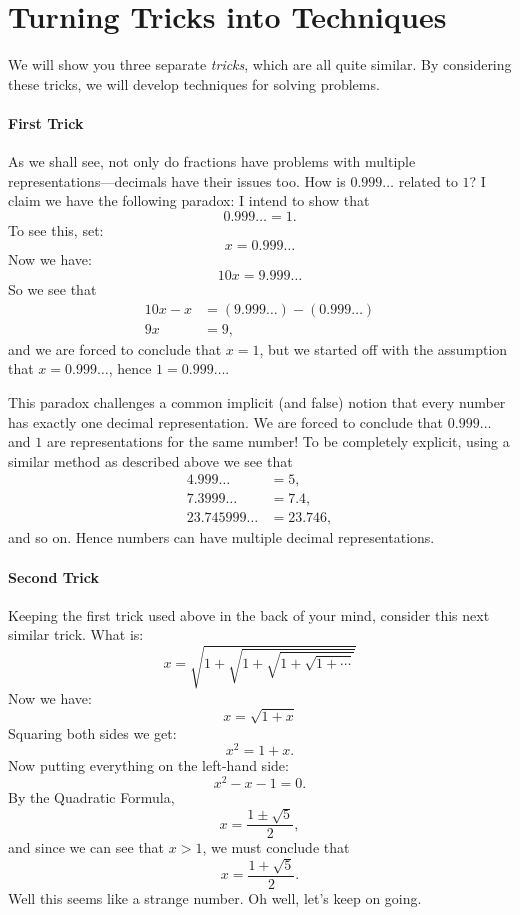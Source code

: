 \newpage
\section{Turning Tricks into Techniques}

We will show you three separate \textit{tricks}, which are all quite
similar. By considering these tricks, we will develop techniques for
solving problems.

\paragraph{First Trick} 
As we shall see, not only do fractions have problems with multiple
representations---decimals have their issues too. How is $0.999\dots$
related to $1$? I claim we have the following paradox: I intend to
show that
\[
0.999\ldots = 1.
\]  
To see this, set:
\[
x=0.999\dots
\]
Now we have:
\[
10x =9.999\dots 
\]
So we see that 
\begin{align*}
10x - x &= (9.999\ldots) -(0.999\ldots) \\
9x &= 9,
\end{align*}
and we are forced to conclude that $x=1$, but we started off with the
assumption that $x= 0.999\dots$, hence $1 = 0.999\dots$.

This paradox challenges a common implicit (and false) notion that
every number has exactly one decimal representation. We are forced to
conclude that $0.999\dots$ and $1$ are representations for the same
number! To be completely explicit, using a similar method as described
above we see that
\begin{align*}
4.999\dots &= 5,\\
7.3999\dots &= 7.4,\\
23.745999\dots &= 23.746,
\end{align*}
and so on. Hence numbers can have multiple decimal representations.


\paragraph{Second Trick}

Keeping the first trick used above in the back of your mind, consider
this next similar trick. What is:
\[
x = \sqrt{1+\sqrt{1+\sqrt{1+\sqrt{1+\cdots}}}}
\]
Now we have:
\[
x = \sqrt{1+x} 
\]
Squaring both sides we get:
\[
x^2 = 1+x.
\]
Now putting everything on the left-hand side:
\[
x^2-x-1 = 0.
\]
By the Quadratic Formula, 
\[
x = \frac{1\pm \sqrt{5}}{2},
\]
and since we can see that $x> 1$, we must conclude that 
\[
x = \frac{1+ \sqrt{5}}{2}.
\]
Well this seems like a strange number. Oh well, let's keep on going.

